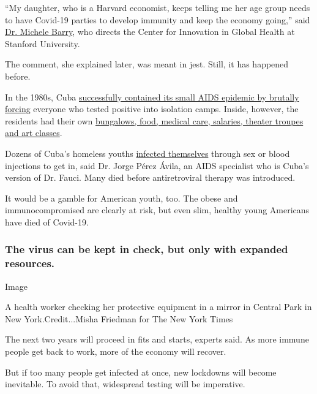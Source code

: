 ``My daughter, who is a Harvard economist, keeps telling me her age
group needs to have Covid-19 parties to develop immunity and keep the
economy going,'' said
\href{https://kingcenter.stanford.edu/people/michele-barry}{Dr. Michele
Barry}, who directs the Center for Innovation in Global Health at
Stanford University.

The comment, she explained later, was meant in jest. Still, it has
happened before.

In the 1980s, Cuba
\href{https://www.nytimes3xbfgragh.onion/2012/05/08/health/a-regimes-tight-grip-lessons-from-cuba-in-aids-control.html}{successfully
contained its small AIDS epidemic by brutally forcing} everyone who
tested positive into isolation camps. Inside, however, the residents had
their own
\href{https://www.nytimes3xbfgragh.onion/2012/05/08/health/cubas-aids-sanitariums-fortresses-against-a-viral-foe.html}{bungalows,
food, medical care, salaries, theater troupes and art classes}.

Dozens of Cuba's homeless youths
\href{https://www.nytimes3xbfgragh.onion/2012/05/08/health/cubas-aids-sanitariums-fortresses-against-a-viral-foe.html}{infected
themselves} through sex or blood injections to get in, said Dr. Jorge
Pérez Ávila, an AIDS specialist who is Cuba's version of Dr. Fauci. Many
died before antiretroviral therapy was introduced.

It would be a gamble for American youth, too. The obese and
immunocompromised are clearly at risk, but even slim, healthy young
Americans have died of Covid-19.

\hypertarget{the-virus-can-be-kept-in-check-but-only-with-expanded-resources}{%
\subsubsection{The virus can be kept in check, but only with expanded
resources.}\label{the-virus-can-be-kept-in-check-but-only-with-expanded-resources}}

Image

A health worker checking her protective equipment in a mirror in Central
Park in New York.Credit...Misha Friedman for The New York Times

The next two years will proceed in fits and starts, experts said. As
more immune people get back to work, more of the economy will recover.

But if too many people get infected at once, new lockdowns will become
inevitable. To avoid that, widespread testing will be imperative.

